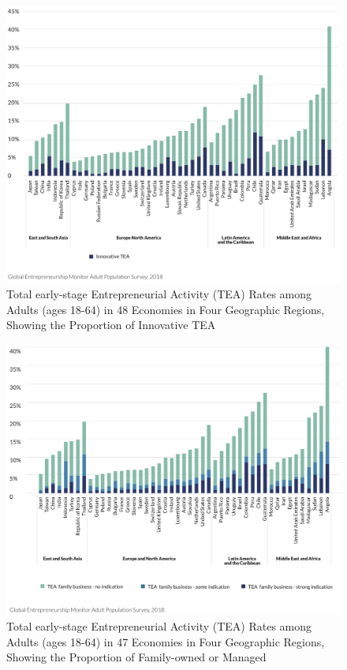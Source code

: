 \documentclass[10pt]{article}
\begin{document}
\begin{figure}[h]
\centerline{\includegraphics[width = 1\textwidth]{screenshot//2_1.png}}
\caption{Total early-stage Entrepreneurial Activity (TEA) Rates among Adults (ages 18-64) in 48 Economies in Four Geographic Regions, Showing the Proportion of Innovative TEA}
\label{fig_InnovativeTEA}
\end{figure}

\begin{figure}[h]
\centerline{\includegraphics[width = 1\textwidth]{screenshot//2_3.png}}
\caption{Total early-stage Entrepreneurial Activity (TEA) Rates among Adults (ages 18-64) in 47 Economies in Four Geographic Regions, Showing the Proportion of Family-owned or Managed}
\label{fig_TEA_family}
\end{figure}
\end{document}
